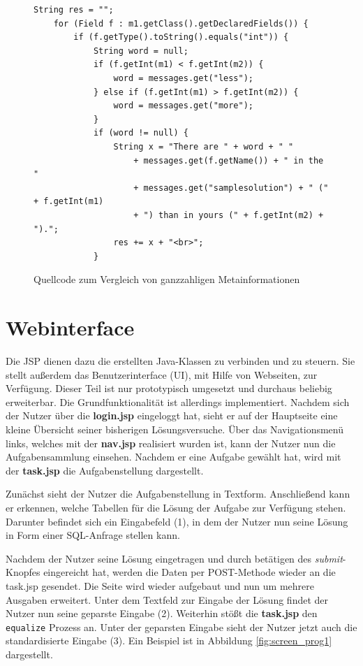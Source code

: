 \begin{figure}[h]
\lstset{language=Java,tabsize=2}
\begin{lstlisting}
String res = "";
	for (Field f : m1.getClass().getDeclaredFields()) {
		if (f.getType().toString().equals("int")) {
			String word = null;
			if (f.getInt(m1) < f.getInt(m2)) {
				word = messages.get("less");
			} else if (f.getInt(m1) > f.getInt(m2)) {
				word = messages.get("more");
			}
			if (word != null) {
				String x = "There are " + word + " "
					+ messages.get(f.getName()) + " in the "
					+ messages.get("samplesolution") + " (" + f.getInt(m1)
					+ ") than in yours (" + f.getInt(m2) + ").";
				res += x + "<br>";
			}
\end{lstlisting}
\caption{Quellcode zum Vergleich von ganzzahligen Metainformationen}
\label{fig:comparecode}
\end{figure}

\section{Webinterface}

Die JSP dienen dazu die erstellten Java-Klassen zu verbinden und zu steuern. Sie stellt außerdem das Benutzerinterface (UI), mit Hilfe von Webseiten, zur Verfügung. Dieser Teil ist nur prototypisch umgesetzt und durchaus beliebig erweiterbar. Die Grundfunktionalität ist allerdings implementiert. Nachdem sich der Nutzer über die \textbf{login.jsp} eingeloggt hat, sieht er auf der Hauptseite eine kleine Übersicht seiner bisherigen Lösungsversuche. Über das Navigationsmenü links, welches mit der \textbf{nav.jsp} realisiert wurden ist, kann der Nutzer nun die Aufgabensammlung einsehen. Nachdem er eine Aufgabe gewählt hat, wird mit der \textbf{task.jsp} die Aufgabenstellung dargestellt.

Zunächst sieht der Nutzer die Aufgabenstellung in Textform. Anschließend kann er erkennen, welche Tabellen für die Lösung der Aufgabe zur Verfügung stehen. Darunter befindet sich ein Eingabefeld (1), in dem der Nutzer nun seine Lösung in Form einer SQL-Anfrage stellen kann.

Nachdem der Nutzer seine Lösung eingetragen und durch betätigen des \textit{submit}-Knopfes eingereicht hat, werden die Daten per POST-Methode wieder an die task.jsp gesendet. Die Seite wird wieder aufgebaut und nun um mehrere Ausgaben erweitert. Unter dem Textfeld zur Eingabe der Lösung findet der Nutzer nun seine geparste Eingabe (2). Weiterhin stößt die \textbf{task.jsp} den \verb|equalize| Prozess an. Unter der geparsten Eingabe sieht der Nutzer jetzt auch die standardisierte Eingabe (3). Ein Beispiel ist in Abbildung \ref{fig:screen_prog1} dargestellt.

